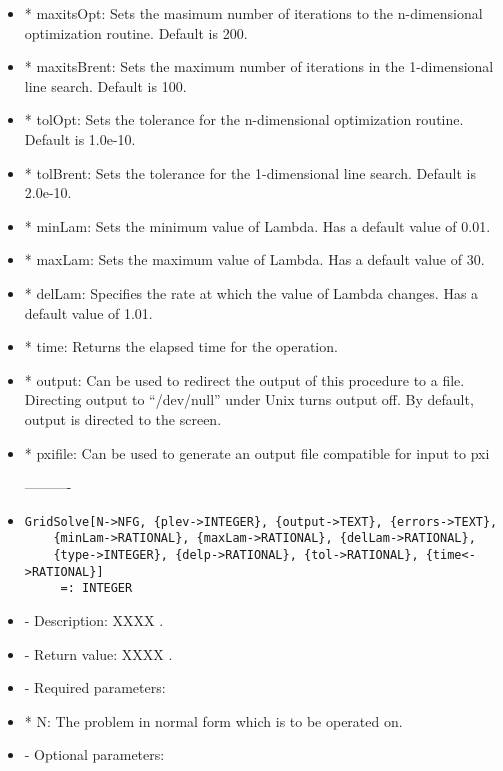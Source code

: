 \begin{itemize}
\item
*  maxitsOpt:  Sets the masimum number of iterations to the 
n-dimensional optimization routine.  Default is 200.
\item
*  maxitsBrent:  Sets the maximum number of iterations in
the 1-dimensional line search.  Default is 100.
\item
*  tolOpt:  Sets the tolerance for the n-dimensional
optimization routine.  Default is 1.0e-10.
\item
*  tolBrent:  Sets the tolerance for the 1-dimensional line
search.  Default is 2.0e-10.
\item
*  minLam:  Sets the minimum value of Lambda.  Has a default value of 0.01.
\item
*  maxLam:  Sets the maximum value of Lambda.  Has a default value of 30.
\item
*  delLam:  Specifies the rate at which the value of Lambda changes. Has a default value of 1.01.
\item
*  time:  Returns the elapsed time for the operation.
\item
*  output:  Can be used to redirect the output of this procedure to a
file.  Directing output to ``/dev/null'' under Unix turns output off.
By default, output is directed to the screen.
\item
*  pxifile: Can be used to generate an output file
compatible for input to pxi
\ed
\ed


----------
\item
\begin{verbatim}
GridSolve[N->NFG, {plev->INTEGER}, {output->TEXT}, {errors->TEXT},
	{minLam->RATIONAL}, {maxLam->RATIONAL}, {delLam->RATIONAL}, 
	{type->INTEGER}, {delp->RATIONAL}, {tol->RATIONAL}, {time<->RATIONAL}]
	 =: INTEGER
\end{verbatim}

\bd
\item
- Description:  XXXX .
\item
- Return value:  XXXX .
\item
- Required parameters:
	
\bd
\item  
*  N:  The problem in normal form which is to be operated on.
\ed

\item
- Optional parameters:


\end{itemize}
